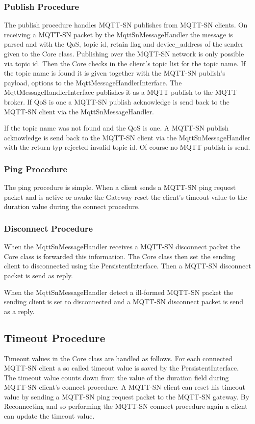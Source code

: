 \subsubsection{Publish Procedure}
The publish procedure handles MQTT-SN publishes from MQTT-SN clients.
On receiving a MQTT-SN packet by the MqttSnMessageHandler the message is parsed and with the QoS, topic id, retain flag and device\_address of the sender given to the Core class.
Publishing over the MQTT-SN network is only possible via topic id.
Then the Core checks in the client's topic list for the topic name.
If the topic name is found it is given together with the MQTT-SN publish's payload, options to the MqttMessageHandlerInterface.
The MqttMessageHandlerInterface publishes it as a MQTT publish to the MQTT broker.
If QoS is one a MQTT-SN publish acknowledge is send back to the MQTT-SN client via the MqttSnMessageHandler.

If the topic name was not found and the QoS is one.
A MQTT-SN publish acknowledge is send back to the MQTT-SN client via the MqttSnMessageHandler with the return typ rejected invalid topic id.
Of course no MQTT publish is send.

\subsubsection{Ping Procedure}
The ping procedure is simple.
When a client sends a MQTT-SN ping request packet and is active or awake the Gateway reset the client's timeout value to the duration value during the connect procedure.

\subsubsection{Disconnect Procedure}
When the MqttSnMessageHandler receives a MQTT-SN disconnect packet the Core class is forwarded this information.
The Core class then set the sending client to disconnected using the PersistentInterface.
Then a MQTT-SN disconnect packet is send as reply.

When the MqttSnMessageHandler detect a ill-formed MQTT-SN packet the sending client is set to disconnected and a MQTT-SN disconnect packet is send as a reply.

\subsection{Timeout Procedure}
Timeout values in the Core class are handled as follows.
For each connected MQTT-SN client a so called timeout value is saved by the PersistentInterface.
The timeout value counts down from the value of the duration field during MQTT-SN client's connect procedure.
A MQTT-SN client can reset his timeout value by sending a MQTT-SN ping request packet to the MQTT-SN gateway.
By Reconnecting and so performing the MQTT-SN connect procedure again a client can update the timeout value.

